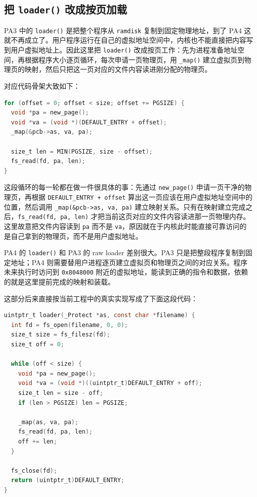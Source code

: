 \documentclass[a4paper]{article}
\begin{document}
\subsection{把 \texttt{loader()} 改成按页加载}
PA3 中的 \texttt{loader()} 是把整个程序从 \texttt{ramdisk} 复制到固定物理地址，到了 PA4 这就不再成立了。用户程序运行在自己的虚拟地址空间中，内核也不能直接把内容写到用户虚拟地址上。因此这里把 \texttt{loader()} 改成按页工作：先为进程准备地址空间，再根据程序大小逐页循环，每次申请一页物理页，用 \texttt{\_map()} 建立虚拟页到物理页的映射，然后只把这一页对应的文件内容读进刚分配的物理页。

对应代码骨架大致如下：
\begin{lstlisting}[language=C]
for (offset = 0; offset < size; offset += PGSIZE) {
  void *pa = new_page();
  void *va = (void *)(DEFAULT_ENTRY + offset);
  _map(&pcb->as, va, pa);

  size_t len = MIN(PGSIZE, size - offset);
  fs_read(fd, pa, len);
}
\end{lstlisting}

这段循环的每一轮都在做一件很具体的事：先通过 \texttt{new\_page()} 申请一页干净的物理页，再根据 \texttt{DEFAULT\_ENTRY + offset} 算出这一页应该在用户虚拟地址空间中的位置，然后调用 \texttt{\_map(\&pcb->as, va, pa)} 建立映射关系。只有在映射建立完成之后，\texttt{fs\_read(fd, pa, len)} 才把当前这页对应的文件内容读进那一页物理内存。这里故意把文件内容读到 \texttt{pa} 而不是 \texttt{va}，原因就在于内核此时能直接可靠访问的是自己拿到的物理页，而不是用户虚拟地址。

PA4 的 \texttt{loader()} 和 PA3 的 raw loader 差别很大。PA3 只是把整段程序复制到固定地址；PA4 则需要替用户进程逐页建立虚拟页和物理页之间的对应关系。程序未来执行时访问到 \texttt{0x8048000} 附近的虚拟地址，能读到正确的指令和数据，依赖的就是这里提前完成的映射和装载。

这部分后来直接按当前工程中的真实实现写成了下面这段代码：
\begin{lstlisting}[language=C]
uintptr_t loader(_Protect *as, const char *filename) {
  int fd = fs_open(filename, 0, 0);
  size_t size = fs_filesz(fd);
  size_t off = 0;

  while (off < size) {
    void *pa = new_page();
    void *va = (void *)((uintptr_t)DEFAULT_ENTRY + off);
    size_t len = size - off;
    if (len > PGSIZE) len = PGSIZE;

    _map(as, va, pa);
    fs_read(fd, pa, len);
    off += len;
  }

  fs_close(fd);
  return (uintptr_t)DEFAULT_ENTRY;
}
\end{lstlisting}
\end{document}
